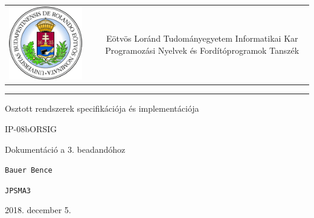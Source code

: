 \documentclass[12pt]{article}
\begin{document}
\def\br{\\[0.1cm]}
\begin{titlepage}
	\vspace*{0cm}
	\centering
	\begin{tabular}{cp{1cm}c}
		\begin{minipage}{4cm}
			\vspace{0pt}
			\includegraphics[width=1\textwidth]{elte_cimer}
		\end{minipage} & &
		\begin{minipage}{7cm}
			\vspace{0pt}Eötvös Loránd Tudományegyetem \vspace{10pt} \newline
			Informatikai Kar \vspace{10pt} \newline
			Programozási Nyelvek és Fordítóprogramok Tanszék
		\end{minipage}
	\end{tabular}
	
	\vspace*{0.2cm}
	\rule{\textwidth}{1pt}
	
	\vspace*{3cm}
	{\Huge Osztott rendszerek specifikációja és implementációja }
	
	\vspace*{0.5cm}
	{\normalsize IP-08bORSIG}
	
	\vspace{2cm}
	{\huge Dokumentáció a 3. beadandóhoz}
	
	\vspace*{5cm}
	
	{\large \verb|Bauer Bence| }
	
	{\large \verb|JPSMA3| }
		
	
	\vfill
	
	\vspace*{1cm}
	2018. december 5.
\end{titlepage}
\end{document}
